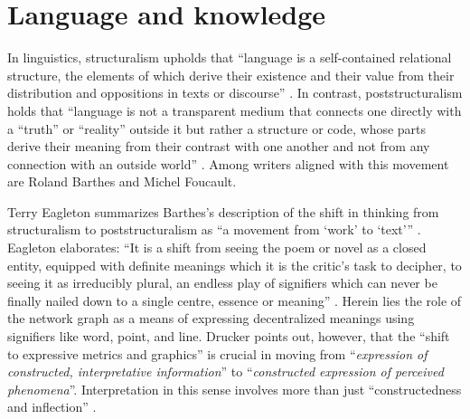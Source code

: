 \section{Language and knowledge}
In linguistics, structuralism upholds that ``language is a self-contained relational structure, the elements of which derive their existence and their value from their distribution and oppositions in texts or discourse” \citep{britannica_structuralism_2024}. In contrast, poststructuralism holds that ``language is not a transparent medium that connects one directly with a ``truth” or ``reality” outside it but rather a structure or code, whose parts derive their meaning from their contrast with one another and not from any connection with an outside world” \citep{britannica_poststructuralism_2024}. Among writers aligned with this movement are Roland Barthes and Michel Foucault. 

Terry Eagleton summarizes Barthes’s description of the shift in thinking from structuralism to poststructuralism as ``a movement from `work’ to `text’” \citep[p. 120]{eagleton_literary_2006}. Eagleton elaborates: ``It is a shift from seeing the poem or novel as a closed entity, equipped with definite meanings which it is the critic’s task to decipher, to seeing it as irreducibly plural, an endless play of signifiers which can never be finally nailed down to a single centre, essence or meaning” \citep[p. 120]{eagleton_literary_2006}. Herein lies the role of the network graph as a means of expressing decentralized meanings using signifiers like word, point, and line. Drucker points out, however, that the ``shift to expressive metrics and graphics” is crucial in moving from ``\textit{expression of constructed, interpretative information}” to ``\textit{constructed expression of perceived phenomena}”\citep[p. 130]{drucker_graphesis_2014}. Interpretation in this sense involves more than just ``constructedness and inflection” \citep[p. 130]{drucker_graphesis_2014}.
 
